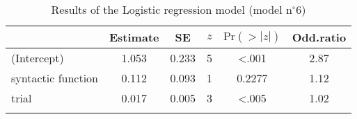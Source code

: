 \begin{table}
\begin{tabular}{l S[table-format=1.3] S[table-format=1.3] S[table-format=1] S[table-format=<1.4] S[table-format=1.2]}
  \lsptoprule
 & {Estimate} & {SE} & {$z$} & {$\text{Pr}(>|z|)$} & {Odd.ratio} \\ 
  \midrule
(Intercept) & 1.053 & 0.233 & 5 & <.001 & 2.87 \\ 
  syntactic function & 0.112 & 0.093 & 1 & 0.2277 & 1.12 \\ 
  trial & 0.017 & 0.005 & 3 & <.005 & 1.02 \\ 
   \lspbottomrule
\end{tabular}
\caption{Results of the Logistic regression model (model n$^{\circ}$6)}
\label{tab:exp02-m6}
\end{table}
